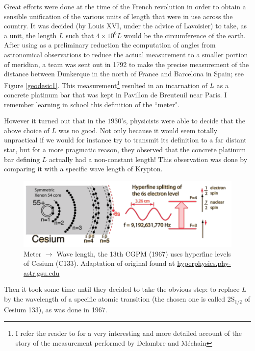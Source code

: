 \documentclass[12pt]{article}
\begin{document}
Great efforts were done at the time of the French revolution in order to obtain a 
sensible unification of the various units of length that were in use across the country. It was decided (by Louis XVI, under the advice of Lavoisier) to take, as a unit, the length $L$ such that $4\times 10^6 L$ would be the circumference of the earth. After using as a preliminary reduction the computation of angles from astronomical observations to reduce the actual measurement to a smaller portion of meridian, a team was sent out in 1792 to make the precise measurement of the distance between Dunkerque in the north of France and Barcelona in Spain; see Figure \ref{geodesic1}. This measurement\footnote{I refer the reader  to \cite{meter} for a very interesting and more detailed account of the story of the measurement performed by Delambre and M\' echain}
 resulted in an incarnation of $L$ as a concrete platinum bar that was kept in Pavillon de Breuteuil near Paris. I remember learning in school this definition of the ``meter".  

However it turned out that in the $1930$'s,  physicists were able to decide that the above choice of $L$ was no good. Not only because it would seem totally unpractical if we would for instance try to transmit its definition to a far distant star, but for a more pragmatic reason, they observed that the concrete platinum bar defining $L$  actually had a non-constant length! This observation was done by comparing it with a specific wave length of Krypton. 
\begin{figure}[H]
\begin{center}
\includegraphics[scale=1]{Csclock.pdf}
\end{center}
\caption{Meter $\to$ Wave length, the 13th CGPM (1967)
uses hyperfine levels of Cesium (C133). Adaptation of original found at \url{hyperphysics.phy-astr.gsu.edu}\label{unit spec} }
\end{figure}

Then it took some time until they decided to take the obvious step: to replace $L$ by the wavelength of a specific atomic transition (the chosen one is called 2S$_{1/2}$ of Cesium 133), as was done in 1967. 
\end{document}
